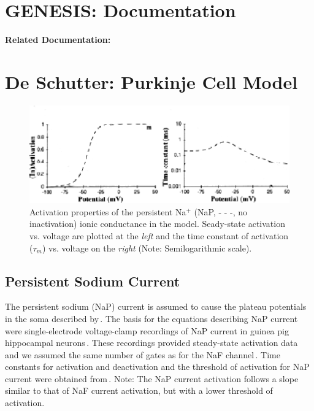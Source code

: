 \documentclass[12pt]{article}
\begin{document}
\section*{GENESIS: Documentation}

{\bf Related Documentation:}

\section*{De Schutter: Purkinje Cell Model}

\begin{figure}[h]
\centering
   \includegraphics[scale=0.75]{figures/DS1.2Ap.eps}
   \caption{Activation properties of the persistent Na$^+$ (NaP, - - -, no inactivation) ionic conductance in the model. Seady-state activation vs. voltage are plotted at the {\em left} and the time constant of activation ($\tau_m$) vs. voltage on the {\em right} (Note: Semilogarithmic scale).}
   \label{fig:DS1.2Ap}
\end{figure}

\subsection*{Persistent Sodium Current}

The persistent sodium (NaP) current is assumed to cause the plateau potentials in the soma described by\,\cite{R:1980ly}. The basis for the equations describing NaP current were single-electrode voltage-clamp recordings of NaP current in guinea pig hippocampal neurons\,\cite{C-R-French:1990uq}. These recordings provided steady-state activation data and we assumed the same number of gates as for the NaF channel\,\cite{hodgkin52:_quantitative_description}. Time constants for activation and deactivation and the threshold of activation for NaP current were obtained from\,\cite{Kay:1990kx}. Note: The NaP current activation follows a slope similar to that of NaF current activation, but with a lower threshold of activation.



\end{document}
